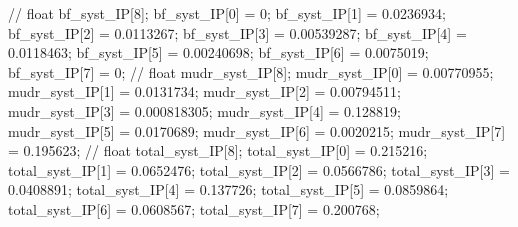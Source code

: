 // float bf_syst_IP[8];
bf_syst_IP[0] = 0; bf_syst_IP[1] = 0.0236934; bf_syst_IP[2] = 0.0113267; 
bf_syst_IP[3] = 0.00539287; bf_syst_IP[4] = 0.0118463; bf_syst_IP[5] = 0.00240698; 
bf_syst_IP[6] = 0.0075019; bf_syst_IP[7] = 0; 
// float mudr_syst_IP[8];
mudr_syst_IP[0] = 0.00770955; mudr_syst_IP[1] = 0.0131734; mudr_syst_IP[2] = 0.00794511; 
mudr_syst_IP[3] = 0.000818305; mudr_syst_IP[4] = 0.128819; mudr_syst_IP[5] = 0.0170689; 
mudr_syst_IP[6] = 0.0020215; mudr_syst_IP[7] = 0.195623; 
// float total_syst_IP[8];
total_syst_IP[0] = 0.215216; total_syst_IP[1] = 0.0652476; total_syst_IP[2] = 0.0566786; 
total_syst_IP[3] = 0.0408891; total_syst_IP[4] = 0.137726; total_syst_IP[5] = 0.0859864; 
total_syst_IP[6] = 0.0608567; total_syst_IP[7] = 0.200768; 



